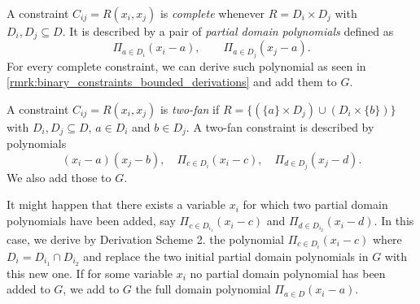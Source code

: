 \documentclass[11pt]{article}
\begin{document}
A constraint $C_{ij} = R(x_i, x_j)$ is \textit{complete} whenever $R = D_i \times D_j$ with $D_i, D_j \subseteq D$. It is described by a pair of \emph{partial domain polynomials} defined as 
\begin{equation*}
    \Pi_{a \in D_i} (x_i - a), \qquad \Pi_{a \in D_j} (x_j - a).
\end{equation*}
For every complete constraint, we can derive such polynomial as seen in \cref{rmrk:binary_constraints_bounded_derivations} and add them to $G$.

A constraint $C_{ij} = R(x_i, x_j)$ is \textit{two-fan} if $R = \{(\{a\} \times D_j) \cup (D_i \times \{b\})\}$ with $D_i, D_j \subseteq D$, $a \in D_i$ and $b \in D_j$. A two-fan constraint is described by polynomials
\begin{equation*}
    (x_i - a)(x_j - b), \quad \Pi_{c \in D_i} (x_i - c), \quad \Pi_{d \in D_j} (x_j - d).
\end{equation*}
We also add those to $G$. 

It might happen that there exists a variable $x_i$ for which two partial domain polynomials have been added, say $\Pi_{c \in D_{i_1}} (x_i - c)$ and $\Pi_{d \in D_{i_2}} (x_i - d)$. In this case, we derive by Derivation Scheme 2. the polynomial $\Pi_{c \in D_i} (x_i - c)$ where $D_i = D_{i_1} \cap D_{i_2}$ and replace the two initial partial domain polynomials in $G$ with this new one. If for some variable $x_i$ no partial domain polynomial has been added to $G$, we add to $G$ the full domain polynomial $\Pi_{a \in D} (x_i - a)$.
\end{document}
